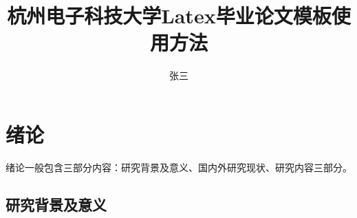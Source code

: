 \documentclass[master]{hdu-thesis}
\title{杭州电子科技大学Latex毕业论文模板使用方法}{Munual of latex on thesis for HDU}
\author{张三}{San Zhang}%
\begin{document}
\makecover
\makedeclaration




























\figurelist

\tablelist

\tableofcontents



\chapter{绪论}
绪论一般包含三部分内容：研究背景及意义、国内外研究现状、研究内容三部分。
\section{研究背景及意义}
\end{document}
